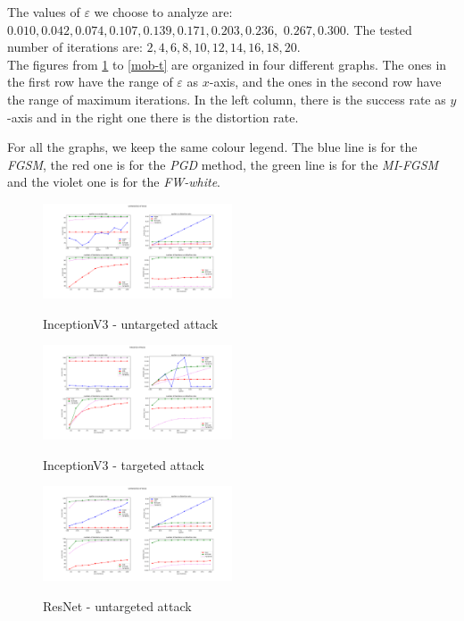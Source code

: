 \documentclass[10pt,twocolumn,letterpaper, english]{article}
\theoremstyle{definition}
\theoremstyle{plain}
\theoremstyle{plain}
\theoremstyle{plain}
\theoremstyle{plain}
\theoremstyle{remark}
\theoremstyle{remark}
\theoremstyle{definition}
\theoremstyle{definition}
\theoremstyle{definition}
\theoremstyle{definition}
\renewcommand{\epsilon}{\varepsilon}
\begin{document}
The values of $\epsilon$ we choose to analyze are: $0.010, 0.042, 0.074, 0.107, 0.139, 0.171, 0.203, 0.236,$  $0.267, 0.300$. The tested number of iterations are: $2,4,6,8,10,12,14,16,18,20$. \\

The figures from \ref{incV3-unt} to \ref{mob-t} are organized in four different graphs. 
The ones in the first row have the range of $\epsilon$ as $x$-axis, and the ones in the second row have the range of maximum iterations. 
In the left column, there is the success rate as $y$-axis and in the right one there is the distortion rate. 

For all the graphs, we keep the same colour legend. 
The blue line is for the \textit{FGSM}, the red one is for the \textit{PGD} method, the green line is for the \textit{MI-FGSM} and the violet one is for the \textit{FW-white}. 

\begin{figure}[ht]
  \centering
  \includegraphics[width=0.5\textwidth]{report_template/Images/inceptionv3_untargeted_grid.pdf}\\
  \caption{InceptionV3 - untargeted attack } \label{incV3-unt}
\end{figure}

\begin{figure}[ht]
  \centering
  \includegraphics[width=0.5\textwidth]{report_template/Images/InceptionV3-targeted_grid.pdf}\\
  \caption{InceptionV3 - targeted attack } \label{incV3-t}
\end{figure}

\begin{figure}[ht]
  \centering
  \includegraphics[width=0.5\textwidth]{report_template/Images/ResNet-untargeted_grid.pdf}\\
  \caption{ResNet - untargeted attack } \label{res-unt}
\end{figure}
\end{document}
